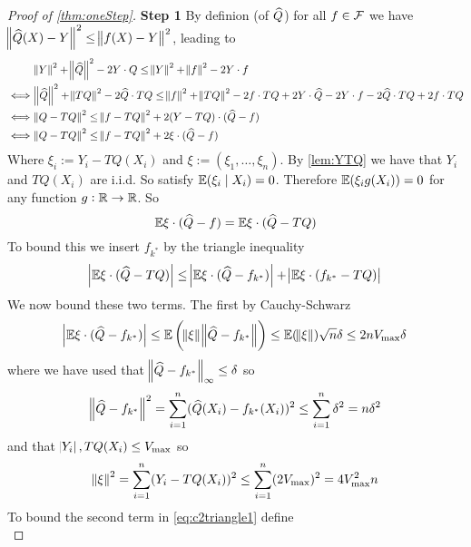 \begin{proof}[Proof of \cref{thm:oneStep}]
  \textbf{Step 1}
  By definion (of $\widehat{Q}$) for all $f \in \mathcal{F}$ we have
  $\norm{\widehat{Q}(X) - Y}^2 \leq \norm{f(X) - Y}^2$, leading to
  \begin{align*}
    & \norm{Y}^2 + \norm{\widehat{Q}}^2 - 2 Y\cdot Q
    \leq \norm{Y}^2 + \norm{f}^2 - 2 Y\cdot f
    \\ \iff & \norm{\widehat{Q}}^2 + \norm{TQ}^2 - 2 \widehat{Q}\cdot TQ 
    \leq \norm{f}^2 + \norm{TQ}^2 - 2 f\cdot TQ + 2 Y\cdot \widehat{Q}
    - 2 Y \cdot f - 2 \widehat{Q}\cdot TQ + 2f\cdot TQ
    \\ \iff & \norm{Q - TQ}^2
    \leq \norm{f - TQ}^2 + 2(Y - TQ)\cdot(\widehat{Q} - f) 
    \\ \iff & \norm{Q - TQ}^2
    \leq \norm{f - TQ}^2 + 2 \xi \cdot (\widehat{Q} - f)
  \end{align*}
  Where $ \xi_i := Y_i - TQ(X_i) $ and $\xi := (\xi_1, \dots, \xi_n)$.
  By \cref{lem:YTQ} we have that $Y_i$ and $TQ(X_i)$ are i.i.d. So 
  satisfy $\mathbb{E}(\xi_i \mid X_i) = 0$.
  Therefore $\mathbb{E}(\xi_i g(X_i)) = 0$ for any function $g:\mathbb{R}\to \mathbb{R}$.
  So
  \begin{equation}
    \mathbb{E} \xi \cdot (\widehat{Q} - f) = \mathbb{E} \xi \cdot (\widehat{Q} - TQ)
  \end{equation}
  To bound this we insert $f_{k^*}$ by the triangle inequality
  \begin{equation}
    \abs{\mathbb{E} \xi \cdot (\widehat{Q} - TQ) }
    \leq \abs{\mathbb{E} \xi \cdot (\widehat{Q} - f_{k^*}) } 
    + \abs{\mathbb{E} \xi \cdot (f_{k^*} - TQ) }
    \label{eq:c2triangle1}
  \end{equation}
  We now bound these two terms. The first by Cauchy-Schwarz
  \begin{equation}
    \abs{\mathbb{E} \xi \cdot (\widehat{Q} - f_{k^*})}
    \leq \mathbb{E} \left( \norm{\xi} \norm{\widehat{Q} - f_{k^*}} \right)
    \leq \mathbb{E} (\norm{\xi}) \sqrt{n} \delta
    \leq 2 n V_{\max} \delta
  \end{equation}
  where we have used that $\norm{\widehat{Q} - f_{k^*}}_\infty \leq \delta$ so
  \begin{equation}
    \norm{\widehat{Q} - f_{k^*}}^2
    = \sum_{i=1}^n (\widehat{Q}(X_i) - f_{k^*}(X_i))^2
    \leq \sum_{i=1}^n \delta^2
    = n \delta^2
  \end{equation}
  and that $\abs{Y_i}, TQ(X_i) \leq V_{\max}$ so
  \begin{equation}
    \norm{\xi}^2 = \sum_{i=1}^n (Y_i - TQ(X_i))^2 
    \leq \sum_{i=1}^n (2 V_{\max})^2
    = 4 V_{\max}^2 n
  \end{equation}
  To bound the second term in \cref{eq:c2triangle1} define
  \begin{equation}

\end{equation}
\end{proof}
